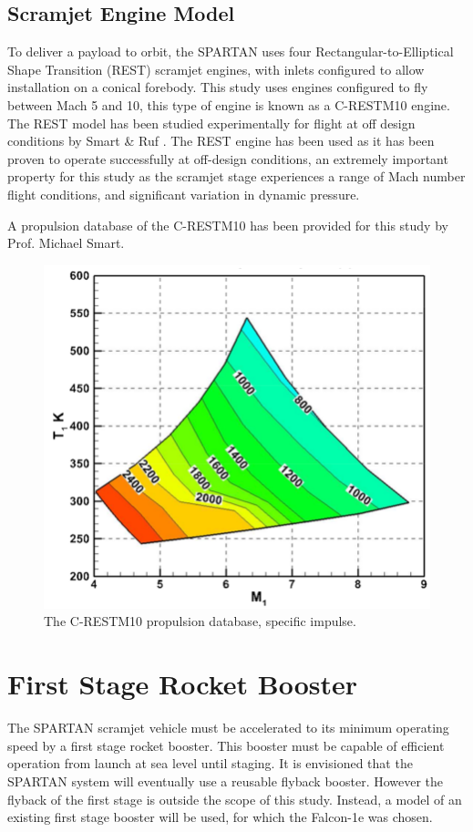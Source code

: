 \subsection{Scramjet Engine Model}
To deliver a payload to orbit, the SPARTAN uses four Rectangular-to-Elliptical Shape Transition (REST) scramjet engines, with inlets configured to allow installation on a conical forebody. This study uses engines configured to fly between Mach 5 and 10, this type of engine is known as a C-RESTM10 engine\cite{Preller2017}. The REST model has been studied experimentally for flight at off design conditions by Smart \& Ruf \cite{Smart2006}. The REST engine has been used as it has been proven to operate successfully at off-design conditions, an extremely important property for this study as the scramjet stage experiences a range of Mach number flight conditions, and significant variation in dynamic pressure.  

A propulsion database of the C-RESTM10 has been provided for this study by Prof. Michael Smart.
\begin{figure}
\centering
\includegraphics[width=0.7\linewidth]{figures/2_literature-review/C-REST}
\caption{The C-RESTM10 propulsion database, specific impulse.}
\label{fig:C-REST}
\end{figure}



\section{First Stage Rocket Booster}

The SPARTAN scramjet vehicle must be accelerated to its minimum operating speed by a first stage rocket booster. This booster must be capable of efficient operation from launch at sea level until staging. It is envisioned that the SPARTAN system will eventually use a reusable flyback booster\cite{Preller2017}. However the flyback of the first stage is outside the scope of this study. Instead, a model of an existing first stage booster will be used, for which the Falcon-1e was chosen.

